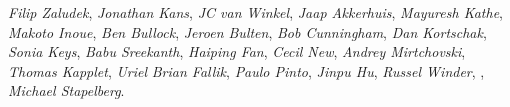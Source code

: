 \emph{Filip Zaludek},
\emph{Jonathan Kans},
\emph{JC van Winkel},
\emph{Jaap Akkerhuis},
\emph{Mayuresh Kathe},
\emph{Makoto Inoue},
\emph{Ben Bullock},
\emph{Jeroen Bulten},
\emph{Bob Cunningham},
\emph{Dan Kortschak},
\emph{Sonia Keys},
\emph{Babu Sreekanth},
\emph{Haiping Fan},
\emph{Cecil New},
\emph{Andrey Mirtchovski},
\emph{Thomas Kapplet},
\emph{Uriel}
\emph{Brian Fallik},
\emph{Paulo Pinto},
\emph{Jinpu Hu},
\emph{Russel Winder},
,
\emph{Michael Stapelberg}.
